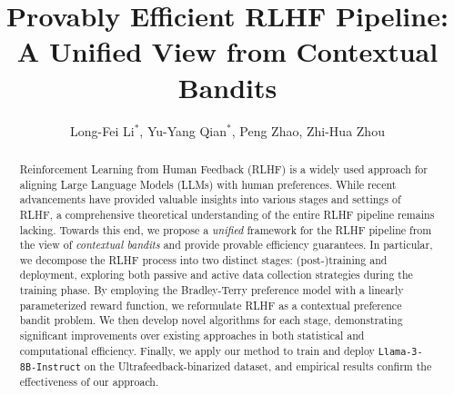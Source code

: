 \documentclass[11pt]{article}
\begin{document}
\title{Provably Efficient RLHF Pipeline: \\ A Unified View from Contextual Bandits}

\author{Long-Fei Li$^*$, Yu-Yang Qian$^*$, Peng Zhao, Zhi-Hua Zhou}
\date{}

\renewcommand{\thefootnote}{\fnsymbol{footnote}}
\renewcommand{\thefootnote}{\arabic{footnote}} 
\setcounter{footnote}{0}

\maketitle

\begin{abstract}
    Reinforcement Learning from Human Feedback (RLHF) is a widely used approach for aligning Large Language Models (LLMs) with human preferences. While recent advancements have provided valuable insights into various stages and settings of RLHF, a comprehensive theoretical understanding of the entire RLHF pipeline remains lacking. Towards this end, we propose a \emph{unified} framework for the RLHF pipeline from the view of \emph{contextual bandits} and provide provable efficiency guarantees. In particular, we decompose the RLHF process into two distinct stages: \mbox{(post-)training} and deployment, exploring both passive and active data collection strategies during the training phase. By employing the Bradley-Terry preference model with a linearly parameterized reward function, we reformulate RLHF as a contextual preference bandit problem. We then develop novel algorithms for each stage, demonstrating significant improvements over existing approaches in both statistical and computational efficiency. Finally, we apply our method to train and deploy \texttt{Llama-3-8B-Instruct} on the \mbox{Ultrafeedback-binarized} dataset, and empirical results confirm the effectiveness of our approach.
\end{abstract}













\newpage
\appendix


\end{document}
